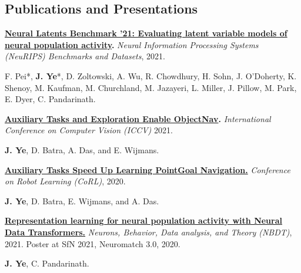 \subsection*{Publications and Presentations}
    \textbf{\href{https://arxiv.org/abs/2109.04463}{Neural Latents Benchmark '21: Evaluating latent variable models of neural population activity}.}
    \emph{Neural Information Processing Systems (NeuRIPS) Benchmarks and Datasets}, 2021.

    \begin{addmargin}[1em]{0em}%
        F. Pei*, \textbf{J. Ye}*, D. Zoltowski, A. Wu, R. Chowdhury, H. Sohn, J. O'Doherty, K. Shenoy, M. Kaufman, M. Churchland, M. Jazayeri, L. Miller, J. Pillow, M. Park, E. Dyer, C. Pandarinath.
    \end{addmargin}

    \textbf{\href{https://joel99.github.io/objectnav/}{Auxiliary Tasks and Exploration Enable ObjectNav}.}
    \emph{International Conference on Computer Vision (ICCV)} 2021.

    \begin{addmargin}[1em]{0em}%
        \textbf{J. Ye}, D. Batra, A. Das, and E. Wijmans.
    \end{addmargin}

    \textbf{
        \href{https://arxiv.org/abs/2007.04561}
        {Auxiliary Tasks Speed Up Learning PointGoal Navigation.}
    } \emph{Conference on Robot Learning (CoRL)}, 2020.
    \begin{addmargin}[1em]{0em}%
        \textbf{J. Ye}, D. Batra, E. Wijmans, and A. Das.
    \end{addmargin}

    \textbf{\href{https://arxiv.org/abs/2108.01210}
    {Representation learning for neural population activity with Neural Data Transformers.}}
    \emph{Neurons, Behavior, Data analysis, and Theory (NBDT)}, 2021. Poster at SfN 2021, Neuromatch 3.0, 2020.
    \begin{addmargin}[1em]{0em}
        \textbf{J. Ye}, C. Pandarinath.
    \end{addmargin}

